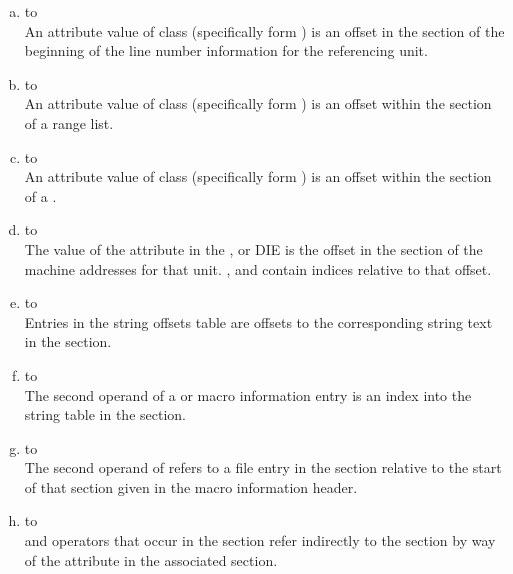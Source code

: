 \begin{enumerate}[(a)]
\item \dotdebuginfo{} to \dotdebugline \\
An attribute value of class 
 (specifically form
\DWFORMsecoffset) 
is an offset in the 
\dotdebugline{} section of the
beginning of the line number information for the referencing unit.

\item \dotdebuginfo{} to \dotdebugranges \\
An attribute value of class  
(specifically form
\DWFORMsecoffset) 
is an offset within the \dotdebugranges{} section of
a range list.

\item \dotdebuginfo{} to \dotdebugloc \\
An attribute value of class  
(specifically form
\DWFORMsecoffset) 
is an offset within the \dotdebugloc{} 
section of a
.

\item \dotdebuginfo{} to \dotdebugaddr \\
The value of the \DWATaddrbase{} attribute in the
\DWTAGcompileunit{}, \DWTAGtypeunit{} or \DWTAGpartialunit{} DIE is the
offset in the \dotdebugaddr{} section of the machine
addresses for that unit.
\DWFORMaddrx, \DWOPaddrx{} and \DWOPconstx{} contain
indices relative to that offset.

\item \dotdebugstroffsets{} to \dotdebugstr \\
Entries in the string offsets table
are offsets to the corresponding string text in the 
\dotdebugstr{} section.

\item \dotdebugmacro{} to \dotdebugstroffsets \\
The second operand of a 
\DWMACROdefineindirect{} or \DWMACROundefindirect{} macro information
entry is an index into the string table in the 
\dotdebugstr{} section.


\item \dotdebugmacro{} to \dotdebugline \\
The second operand of 
\DWMACROstartfile{} refers to a file entry in the 
\dotdebugline{} section relative to the start 
of that section given in the macro information header.

\item \dotdebugloc{} to \dotdebugaddr \\
\DWOPaddrx{} and \DWOPconstx{} operators that occur in the 
\dotdebugloc{} section refer indirectly to the 
\dotdebugaddr{} section by way of the 
\DWATaddrbase{} attribute in the associated \dotdebuginfo{} 
section. 


\end{enumerate}
